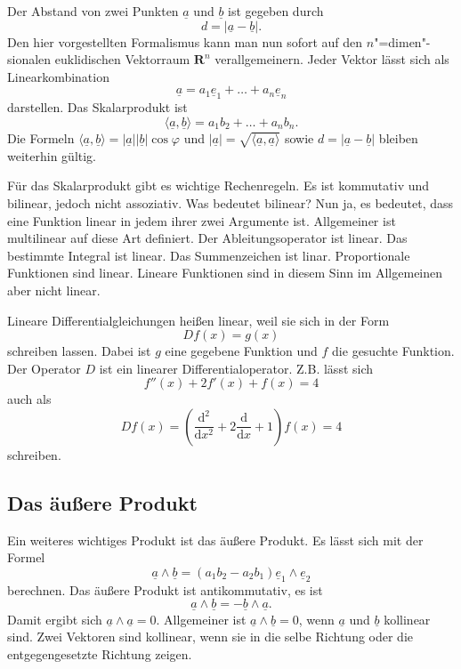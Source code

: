 \documentclass[a4paper,10pt,fleqn,twocolumn,twoside]{article}
\begin{document}
Der Abstand von zwei Punkten \(\underline a\) und \(\underline b\)
ist gegeben durch
\[d = |\underline a-\underline b|.\]
\noindent
Den hier vorgestellten Formalismus kann man nun sofort auf den
\(n\)"=dimen"-sionalen euklidischen Vektorraum \(\mathbf{R}^n\)
verallgemeinern. Jeder Vektor lässt sich als Linearkombination
\[\underline a = a_1\underline e_1+\dots+a_n\underline e_n\]
darstellen. Das Skalarprodukt ist
\[\langle \underline a, \underline b\rangle = a_1b_2+\dots+a_nb_n.\]
Die Formeln
\(\langle \underline a, \underline b\rangle
= |\underline a||\underline b|\cos\varphi\)
und
\(|\underline a| = \sqrt{\langle \underline a, \underline a\rangle}\)
sowie \(d = |\underline a-\underline b|\)
bleiben weiterhin gültig.

Für das Skalarprodukt gibt es wichtige Rechenregeln. Es ist kommutativ
und bilinear, jedoch nicht assoziativ.
Was bedeutet bilinear? Nun ja, es bedeutet, dass eine Funktion linear
in jedem ihrer zwei Argumente ist. Allgemeiner ist multilinear auf
diese Art definiert. Der Ableitungsoperator ist linear. Das bestimmte
Integral ist linear. Das Summenzeichen ist linar. Proportionale
Funktionen sind linear. Lineare Funktionen sind in diesem Sinn im
Allgemeinen aber nicht linear.

Lineare Differentialgleichungen heißen linear,
weil sie sich in der Form
\[Df(x)=g(x)\]
schreiben lassen. Dabei ist \(g\) eine gegebene Funktion und \(f\)
die gesuchte Funktion. Der Operator \(D\) ist ein linearer
Differentialoperator. Z.B. lässt sich
\[f''(x) + 2f'(x) + f(x) = 4\]
auch als
\[Df(x) = \left(\frac{\mathrm d^2}{\mathrm dx^2}
+2\frac{\mathrm d}{\mathrm dx}
+1\right) f(x) = 4\]
schreiben.

\subsection{Das äußere Produkt}

Ein weiteres wichtiges Produkt ist das äußere Produkt.
Es lässt sich mit der Formel
\[\underline a\wedge\underline b
= (a_1b_2-a_2b_1)\underline e_1\wedge\underline e_2\]
berechnen. Das äußere Produkt ist antikommutativ, es ist
\[\underline a\wedge\underline b = -\underline b\wedge\underline a.\]
\noindent
Damit ergibt sich \(\underline a\wedge\underline a = 0\).
Allgemeiner ist
\(\underline a\wedge\underline b = 0\),
wenn \(\underline a\) und \(\underline b\) kollinear sind.
Zwei Vektoren sind kollinear, wenn sie in die selbe Richtung oder
die entgegengesetzte Richtung zeigen.
\end{document}
